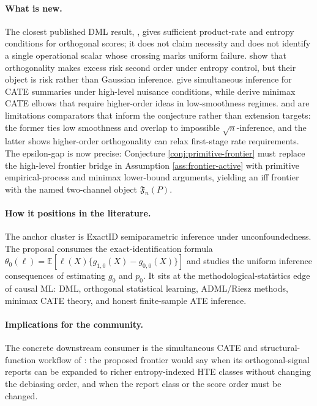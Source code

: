 \documentclass[11pt]{article}
\newcommand{\E}{\mathbb{E}}
\theoremstyle{definition}
\theoremstyle{plain}
\theoremstyle{remark}
\begin{document}
\paragraph{What is new.}
The closest published DML result, \citet[\S3]{ChernozhukovEtAl2018DML}, gives
sufficient product-rate and entropy conditions for orthogonal scores; it does
not claim necessity and does not identify a single operational scalar whose
crossing marks uniform failure.  \citet[\S2--\S3]{FosterSyrgkanis2023OSL}
show that orthogonality makes excess risk second order under entropy control,
but their object is risk rather than Gaussian inference.  \citet[\S3]{SemenovaChernozhukov2021DMLCATE}
give simultaneous inference for CATE summaries under high-level nuisance
conditions, while \citet[\S2--\S4]{KennedyBalakrishnanRobinsWasserman2024MinimaxCATE}
derive minimax CATE elbows that require higher-order ideas in low-smoothness
regimes.  \citet[abstract and pp.~1141--1142]{ArmstrongKolesar2021FiniteSampleATE}
and \citet[abstract]{MackeySyrgkanisZadik2018OML} are limitations comparators
that inform the conjecture rather than extension targets: the former ties low
smoothness and overlap to impossible \(\sqrt n\)-inference, and the latter
shows higher-order orthogonality can relax first-stage rate requirements.  The
epsilon-gap is now precise: Conjecture \ref{conj:primitive-frontier} must
replace the high-level frontier bridge in Assumption \ref{ass:frontier-active}
with primitive empirical-process and minimax lower-bound arguments, yielding an
iff frontier with the named two-channel object \(\mathfrak{F}_n(P)\).

\paragraph{How it positions in the literature.}
The anchor cluster is ExactID semiparametric inference under unconfoundedness.
The proposal consumes the exact-identification formula
\(\theta_0(\ell)=\E[\ell(X)\{g_{1,0}(X)-g_{0,0}(X)\}]\) and studies the
uniform inference consequences of estimating \(g_0\) and \(p_0\).  It sits at
the methodological-statistics edge of causal ML: DML, orthogonal statistical
learning, ADML/Riesz methods, minimax CATE theory, and honest finite-sample ATE
inference.

\paragraph{Implications for the community.}
The concrete downstream consumer is the simultaneous CATE and structural-function
workflow of \citet{SemenovaChernozhukov2021DMLCATE}: the proposed frontier would
say when its orthogonal-signal reports can be expanded to richer entropy-indexed
HTE classes without changing the debiasing order, and when the report class or
the score order must be changed.
\end{document}
